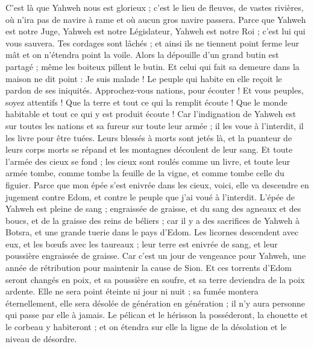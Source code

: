 \begin{multicols}{2}
C'est là que Yahweh nous est glorieux ; c'est le lieu de fleuves, de vastes rivières, où n'ira pas de navire à rame et où aucun gros navire passera.
Parce que Yahweh est notre Juge, Yahweh est notre Législateur, Yahweh est notre Roi ; c'est lui qui vous sauvera.
Tes cordages sont lâchés ; et ainsi ils ne tiennent point ferme leur mât et on n'étendra point la voile. Alors la dépouille d'un grand butin est partagé ; même les boiteux pillent le butin.
Et celui qui fait sa demeure dans la maison ne dit point : Je suis malade ! Le peuple qui habite en elle reçoit le pardon de ses iniquités.
\VerseOne{}Approchez-vous nations, pour écouter ! Et vous peuples, soyez attentifs ! Que la terre et tout ce qui la remplit écoute ! Que le monde habitable et tout ce qui y est produit écoute !
Car l'indignation de Yahweh est sur toutes les nations et sa fureur sur toute leur armée ; il les voue à l'interdit, il les livre pour être tuées.
Leurs blessés à morts sont jetés là, et la puanteur de leurs corps morts se répand et les montagnes découlent de leur sang.
Et toute l'armée des cieux se fond ; les cieux sont roulés comme un livre, et toute leur armée tombe, comme tombe la feuille de la vigne, et comme tombe celle du figuier.
Parce que mon épée s'est enivrée dans les cieux, voici, elle va descendre en jugement contre Edom, et contre le peuple que j'ai voué à l'interdit.
L'épée de Yahweh est pleine de sang ; engraissée de graisse, et du sang des agneaux et des boucs, et de la graisse des reins de béliers ; car il y a des sacrifices de Yahweh à Botsra, et une grande tuerie dans le pays d'Edom.
Les licornes descendent avec eux, et les bœufs avec les taureaux ; leur terre est enivrée de sang, et leur poussière engraissée de graisse.
Car c'est un jour de vengeance pour Yahweh, une année de rétribution pour maintenir la cause de Sion.
Et ces torrents d'Edom seront changés en poix, et sa poussière en soufre, et sa terre deviendra de la poix ardente.
Elle ne sera point éteinte ni jour ni nuit ; sa fumée montera éternellement, elle sera désolée de génération en génération ; il n'y aura personne qui passe par elle à jamais.
Le pélican et le hérisson la posséderont, la chouette et le corbeau  y habiteront ; et on étendra sur elle la ligne de la désolation et le niveau de désordre.

\end{multicols}
